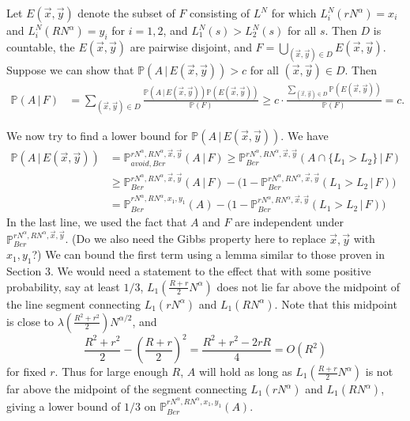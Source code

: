 \documentclass[12pt]{article}
\begin{document}
	Let $E(\vec{x},\vec{y})$ denote the subset of $F$ consisting of $L^N$ for which $L_i^N(rN^\alpha) = x_i$ and $L_i^N(RN^\alpha)=y_i$ for $i=1,2$, and $L_1^N(s) > L_2^N(s)$ for all $s$. Then $D$ is countable, the $E(\vec{x},\vec{y})$ are pairwise disjoint, and $F = \bigcup_{(\vec{x},\vec{y})\in D} E(\vec{x},\vec{y})$. Suppose we can show that $\mathbb{P}(A\,|\,E(\vec{x},\vec{y})) > c$ for all $(\vec{x},\vec{y})\in D$. Then
	\begin{align*}
	\mathbb{P}(A\,|\,F) &= \sum_{(\vec{x},\vec{y})\in D} \frac{\mathbb{P}(A\,|\,E(\vec{x},\vec{y}))\mathbb{P}(E(\vec{x},\vec{y}))}{\mathbb{P}(F)} \geq c\cdot\frac{\sum_{(\vec{x},\vec{y})\in D} \mathbb{P}(E(\vec{x},\vec{y}))}{\mathbb{P}(F)} = c.
	\end{align*}
	
	We now try to find a lower bound for $\mathbb{P}(A\,|\,E(\vec{x},\vec{y}))$. We have
	\begin{align*}
	\mathbb{P}(A\,|\,E(\vec{x},\vec{y})) &= \mathbb{P}^{rN^\alpha, RN^\alpha,\vec{x},\vec{y}}_{avoid,Ber} (A\,|\,F) \geq \mathbb{P}^{rN^\alpha, RN^\alpha,\vec{x},\vec{y}}_{Ber} (A\cap\{L_1 > L_2\}\,|\,F)\\
	&\geq \mathbb{P}^{rN^\alpha, RN^\alpha,\vec{x},\vec{y}}_{Ber} (A\,|\,F) - \big( 1 - \mathbb{P}^{rN^\alpha, RN^\alpha,\vec{x},\vec{y}}_{Ber} (L_1 > L_2\,|\,F)\big)\\
	&= \mathbb{P}^{rN^\alpha, RN^\alpha,x_1,y_1}_{Ber} (A) - \big( 1 - \mathbb{P}^{rN^\alpha, RN^\alpha,\vec{x},\vec{y}}_{Ber} (L_1 > L_2\,|\,F)\big)
	\end{align*}
	In the last line, we used the fact that $A$ and $F$ are independent under $\mathbb{P}^{rN^\alpha, RN^\alpha,\vec{x},\vec{y}}_{Ber}$. (Do we also need the Gibbs property here to replace $\vec{x},\vec{y}$ with $x_1,y_1$?) We can bound the first term using a lemma similar to those proven in Section 3. We would need a statement to the effect that  with some positive probability, say at least $1/3$, $L_1(\frac{R+r}{2}N^\alpha)$ does not lie far above the midpoint of the line segment connecting $L_1(rN^\alpha)$ and $L_1(RN^\alpha)$. Note that this midpoint is close to $\lambda(\frac{R^2+r^2}{2})N^{\alpha/2}$, and
	\[
	 \frac{R^2+r^2}{2} - \left(\frac{R+r}{2}\right)^2 = \frac{R^2 + r^2 - 2rR}{4} = O(R^2)
	\]
	for fixed $r$. Thus for large enough $R$, $A$ will hold as long as $L_1(\frac{R+r}{2}N^\alpha)$ is not far above the midpoint of the segment connecting $L_1(rN^\alpha)$ and $L_1(RN^\alpha)$, giving a lower bound of $1/3$ on $\mathbb{P}^{rN^\alpha, RN^\alpha,x_1,y_1}_{Ber}(A)$.
	
\end{document}
